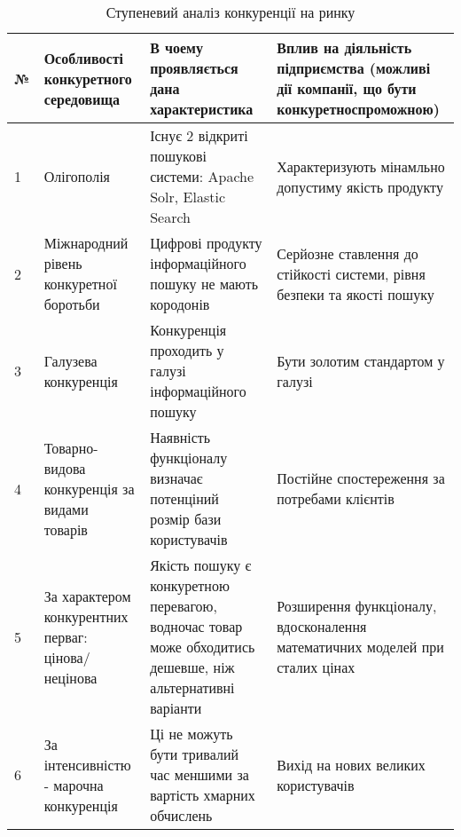 \begin{table}
	\begin{tabular}
		{|l|p{4cm}|p{4cm}|p{4cm}|} \hline
		№ & Особливості конкуретного середовища & В чоему проявляється дана характеристика & Вплив на діяльність підприємства (можливі дії компанії, що бути конкуретноспроможною) \\ \hline
		1 & Олігополія & Існує 2 відкриті пошукові системи: Apache Solr, Elastic Search & Характеризують мінамльно допустиму якість продукту \\ \hline
		2 & Міжнародний рівень конкуретної боротьби & Цифрові продукту інформаційного пошуку не мають кородонів & Серйозне ставлення до стійкості системи, рівня безпеки та якості пошуку \\ \hline
		3 & Галузева конкуренція & Конкуренція проходить у галузі інформаційного пошуку & Бути золотим стандартом у галузі \\ \hline
		4 & Товарно-видова конкуренція за видами товарів & Наявність функціоналу визначає потенціний розмір бази користувачів & Постійне спостереження за потребами клієнтів \\ \hline
		5 & За характером конкурентних перваг: цінова/нецінова & Якість пошуку є конкуретною перевагою, водночас товар може обходитись дешевше, ніж альтернативні варіанти & Розширення функціоналу, вдосконалення математичних моделей при сталих цінах \\ \hline
		6 & За інтенсивністю - марочна конкуренція & Ці не можуть бути тривалий час меншими за вартість хмарних обчислень & Вихід на нових великих користувачів \\ \hline
	\end{tabular}
	\caption{Ступеневий аналіз конкуренції на ринку}
\end{table}


